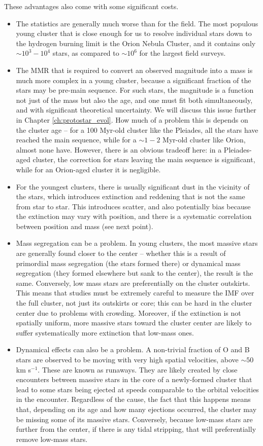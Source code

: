 These advantages also come with some significant costs.
\begin{itemize}
\item The statistics are generally much worse than for the field. The most populous young cluster that is close enough for us to resolve individual stars down to the hydrogen burning limit is the Orion Nebula Cluster, and it contains only $\sim 10^3 - 10^4$ stars, as compared to $\sim 10^6$ for the largest field surveys.
\item The MMR that is required to convert an observed magnitude into a mass is much more complex in a young cluster, because a significant fraction of the stars may be pre-main sequence. For such stars, the magnitude is a function not just of the mass but also the age, and one must fit both simultaneously, and with significant theoretical uncertainty. We will discuss this issue further in Chapter \ref{ch:protostar_evol}. How much of a problem this is depends on the cluster age -- for a 100 Myr-old cluster like the Pleiades, all the stars have reached the main sequence, while for a $\sim 1-2$ Myr-old cluster like Orion, almost none have. However, there is an obvious tradeoff here: in a Pleiades-aged cluster, the correction for stars leaving the main sequence is significant, while for an Orion-aged cluster it is negligible.
\item For the youngest clusters, there is usually significant dust in the vicinity of the stars, which introduces extinction and reddening that is not the same from star to star. This introduces scatter, and also potentially bias because the extinction may vary with position, and there is a systematic correlation between position and mass (see next point).
\item Mass segregation can be a problem. In young clusters, the most massive stars are generally found closer to the center -- whether this is a result of primordial mass segregation (the stars formed there) or dynamical mass segregation (they formed elsewhere but sank to the center), the result is the same. Conversely, low mass stars are preferentially on the cluster outskirts. This means that studies must be extremely careful to measure the IMF over the full cluster, not just its outskirts or core; this can be hard in the cluster center due to problems with crowding. Moreover, if the extinction is not spatially uniform, more massive stars toward the cluster center are likely to suffer systematically more extinction that low-mass ones.
\item Dynamical effects can also be a problem. A non-trivial fraction of O and B stars are observed to be moving with very high spatial velocities, above $\sim 50$ km s$^{-1}$. These are known as runaways. They are likely created by close encounters between massive stars in the core of a newly-formed cluster that lead to some stars being ejected at speeds comparable to the orbital velocities in the encounter. Regardless of the cause, the fact that this happens means that, depending on its age and how many ejections occurred, the cluster may be missing some of its massive stars. Conversely, because low-mass stars are further from the center, if there is any tidal stripping, that will preferentially remove low-mass stars.

\end{itemize}
